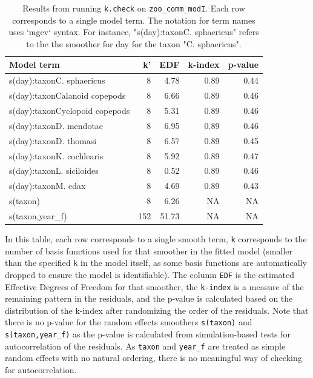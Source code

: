 \documentclass[12pt]{article}
\begin{document}
\begin{table}[t]

\caption{\label{tab:zoo_comm_check_k_kable}Results from running \texttt{k.check} on \texttt{zoo\_comm\_modI}. Each row corresponds to a single model term. The notation for term names uses `mgcv` syntax. For instance, "s(day):taxonC. sphaericus" refers to the the smoother for day for the taxon "C. sphaericus".}
\centering
\begin{tabular}{lrrrr}
\toprule
Model term & k' & EDF & k-index & p-value\\
\midrule
s(day):taxonC. sphaericus & 8 & 4.78 & 0.89 & 0.44\\
s(day):taxonCalanoid copepods & 8 & 6.66 & 0.89 & 0.46\\
s(day):taxonCyclopoid copepods & 8 & 5.31 & 0.89 & 0.46\\
s(day):taxonD. mendotae & 8 & 6.95 & 0.89 & 0.46\\
s(day):taxonD. thomasi & 8 & 6.57 & 0.89 & 0.45\\
\addlinespace
s(day):taxonK. cochlearis & 8 & 5.92 & 0.89 & 0.47\\
s(day):taxonL. siciloides & 8 & 0.52 & 0.89 & 0.46\\
s(day):taxonM. edax & 8 & 4.69 & 0.89 & 0.43\\
s(taxon) & 8 & 6.26 & NA & NA\\
s(taxon,year\_f) & 152 & 51.73 & NA & NA\\
\bottomrule
\end{tabular}
\end{table}

In this table, each row corresponds to a single smooth term,
\texttt{k\textquotesingle{}} corresponds to the number of basis
functions used for that smoother in the fitted model (smaller than the
specified \texttt{k} in the model itself, as some basis functions are
automatically dropped to ensure the model is identifiable). The column
\texttt{EDF} is the estimated Effective Degrees of Freedom for that
smoother, the \texttt{k-index} is a measure of the remaining pattern in
the residuals, and the p-value is calculated based on the distribution
of the k-index after randomizing the order of the residuals. Note that
there is no p-value for the random effects smoothers \texttt{s(taxon)}
and \texttt{s(taxon,year\_f)} as the p-value is calculated from
simulation-based tests for autocorrelation of the residuals. As
\texttt{taxon} and \texttt{year\_f} are treated as simple random effects
with no natural ordering, there is no meaningful way of checking for
autocorrelation.
\end{document}
